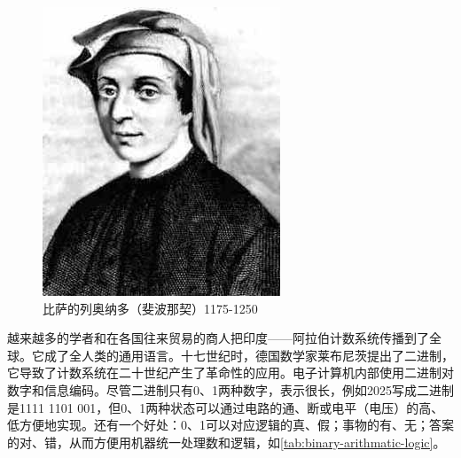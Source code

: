\documentclass[b5paper]{ctexart}
\begin{document}
\begin{figure}[htbp]
 \centering
 \includegraphics[scale=0.35]{img/Fibonacci}
 \caption{比萨的列奥纳多（斐波那契）1175-1250}
 \label{fig:Fibonacci}
\end{figure}

\label{sec:binary-numerals} 
越来越多的学者和在各国往来贸易的商人把印度——阿拉伯计数系统传播到了全球。它成了全人类的通用语言。十七世纪时，德国数学家莱布尼茨提出了二进制，它导致了计数系统在二十世纪产生了革命性的应用。电子计算机内部使用二进制对数字和信息编码。尽管二进制只有0、1两种数字，表示很长，例如2025写成二进制是1111 1101 001，但0、1两种状态可以通过电路的通、断或电平（电压）的高、低方便地实现。还有一个好处：0、1可以对应逻辑的真、假；事物的有、无；答案的对、错，从而方便用机器统一处理数和逻辑，如\cref{tab:binary-arithmatic-logic}。
\end{document}
